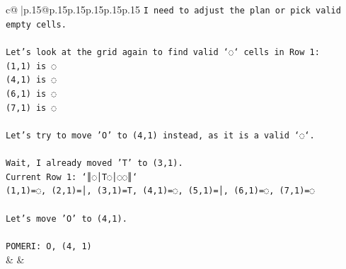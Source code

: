 \documentclass{article}
\begin{document}
{\begin{supertabular}{c@{$\;$}|p{.15\linewidth}@{}p{.15\linewidth}p{.15\linewidth}p{.15\linewidth}p{.15\linewidth}p{.15\linewidth}}
{{{\texttt{I need to adjust the plan or pick valid empty cells.} \\
\\ 
\texttt{Let's look at the grid again to find valid `◌` cells in Row 1:} \\
\texttt{(1,1) is ◌} \\
\texttt{(4,1) is ◌} \\
\texttt{(6,1) is ◌} \\
\texttt{(7,1) is ◌} \\
\\ 
\texttt{Let's try to move 'O' to (4,1) instead, as it is a valid `◌`.} \\
\\ 
\texttt{Wait, I already moved 'T' to (3,1).} \\
\texttt{Current Row 1: `║◌│T◌│◌◌║`} \\
\texttt{(1,1)=◌, (2,1)=│, (3,1)=T, (4,1)=◌, (5,1)=│, (6,1)=◌, (7,1)=◌} \\
\\ 
\texttt{Let's move 'O' to (4,1).} \\
\\ 
\texttt{POMERI: O, (4, 1)} \\
            }
        }
    }
    & & \\ \\


\end{supertabular}}
\end{document}
